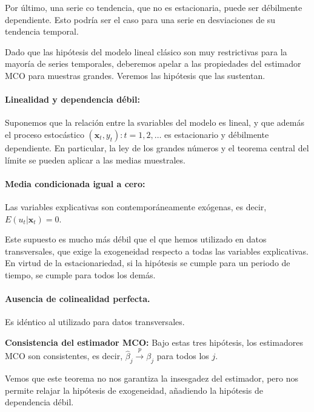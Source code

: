 Por \'ultimo, una serie co tendencia, que no es estacionaria, puede ser d\'ebilmente dependiente. Esto podr\'ia ser el caso para una serie en desviaciones de su tendencia temporal.


Dado que las hip\'otesis del modelo lineal cl\'asico son muy restrictivas para la mayor\'ia de series temporales, deberemos apelar a las propiedades del estimador MCO para muestras grandes. Veremos las hip\'otesis que las sustentan.

\paragraph*{Linealidad y dependencia d\'ebil:}
Suponemos que la relaci\'on entre la svariables del modelo es lineal, y que adem\'as el proceso estoc\'astico ${(\boldsymbol{x}_t,y_t):t=1,2,\ldots}$ es estacionario y d\'ebilmente dependiente. En particular, la ley de los grandes n\'umeros y el teorema central del l\'imite se pueden aplicar a las medias muestrales.

\paragraph*{Media condicionada igual a cero:}
Las variables explicativas son contempor\'aneamente ex\'ogenas, es decir, $E(u_t|\boldsymbol{x}_t)=0$.

Este supuesto es mucho m\'as d\'ebil que el que hemos utilizado en datos transversales, que exige la exogeneidad respecto a todas las variables explicativas. En virtud de la estacionariedad, si la hip\'otesis se cumple para un periodo de tiempo, se cumple para todos los dem\'as.
\paragraph*{Ausencia de colinealidad perfecta.}
Es id\'entico al utilizado para datos transversales.

\begin{teorema}
\textbf{Consistencia del estimador MCO:} Bajo estas tres hip\'otesis, los estimadores MCO son consistentes, es decir, $\hat{\beta}_j\overset{p}{\to}\beta_j$ para todos los $j$.
\end{teorema}

Vemos que este teorema no nos garantiza la insesgadez del estimador, pero nos permite relajar la hip\'otesis de exogeneidad, a\~nadiendo la hip\'otesis de dependencia d\'ebil.

